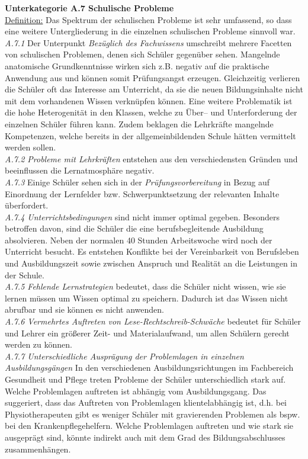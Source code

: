 \noindent
\textbf{Unterkategorie A.7 Schulische Probleme}\\
\underline{Definition:} Das Spektrum der schulischen Probleme ist sehr umfassend, so dass eine weitere Untergliederung in die einzelnen schulischen Probleme sinnvoll war.\\
\textit{A.7.1} Der Unterpunkt \textit{Bezüglich des Fachwissens} umschreibt mehrere Facetten von schulischen Problemen, denen sich Schüler gegenüber sehen. Mangelnde anatomische Grundkenntnisse wirken sich z.B. negativ auf die praktische Anwendung aus und können somit Prüfungsangst erzeugen. Gleichzeitig verlieren die Schüler oft das Interesse am Unterricht, da sie die neuen Bildungsinhalte nicht mit dem vorhandenen Wissen verknüpfen können. Eine weitere Problematik ist die hohe Heterogenität in den Klassen, welche zu Über-- und Unterforderung der einzelnen Schüler führen kann. Zudem beklagen die Lehrkräfte mangelnde Kompetenzen, welche bereits in der allgemeinbildenden Schule hätten vermittelt werden sollen.\\
\textit{A.7.2 Probleme mit Lehrkräften} entstehen aus den verschiedensten Gründen und beeinflussen die Lernatmosphäre negativ.\\
\textit{A.7.3} Einige Schüler sehen sich in der \textit{Prüfungsvorbereitung} in Bezug auf Einordnung der Lernfelder bzw. Schwerpunktsetzung der relevanten Inhalte überfordert.\\
\textit{A.7.4 Unterrichtsbedingungen} sind nicht immer optimal gegeben. Besonders betroffen davon, sind die Schüler die eine berufsbegleitende Ausbildung absolvieren. Neben der normalen 40 Stunden Arbeitswoche wird noch der Unterricht besucht. Es entstehen Konflikte bei der Vereinbarkeit von Berufsleben und Ausbildungszeit sowie zwischen Anspruch und Realität an die Leistungen in der Schule. \\
\textit{A.7.5 Fehlende Lernstrategien} bedeutet, dass die Schüler nicht wissen, wie sie lernen müssen um Wissen optimal zu speichern. Dadurch ist das Wissen nicht abrufbar und sie können es nicht anwenden.\\
\textit{A.7.6 Vermehrtes Auftreten von Lese-Rechtschreib-Schwäche} bedeutet für Schüler und Lehrer ein größerer Zeit- und Materialaufwand, um allen Schülern gerecht werden zu können.\\
\textit{A.7.7 Unterschiedliche Ausprägung der Problemlagen in einzelnen Ausbildungsgängen}
In den verschiedenen Ausbildungsrichtungen im Fachbereich Gesundheit und Pflege treten Probleme der Schüler unterschiedlich stark auf. Welche Problemlagen auftreten ist abhängig vom Ausbildungsgang. Das suggeriert, dass das Auftreten von Problemlagen klientelabhängig ist, d.h. bei Physiotherapeuten gibt es weniger Schüler mit gravierenden Problemen als bspw. bei den Krankenpflegehelfern. Welche Problemlagen auftreten und wie stark sie ausgeprägt sind, könnte indirekt auch mit dem Grad des Bildungsabschlusses zusammenhängen.\\
